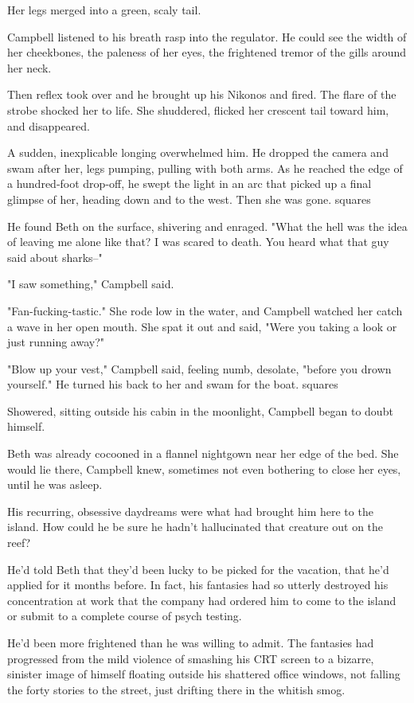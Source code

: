 Her legs merged into a green, scaly tail.

Campbell listened to his breath rasp into the regulator. He could see the width of her cheekbones, the paleness of her eyes, the frightened tremor of the gills around her neck.

Then reflex took over and he brought up his Nikonos and fired. The flare of the strobe shocked her to life. She shuddered, flicked her crescent tail toward him, and disappeared.

A sudden, inexplicable longing overwhelmed him. He dropped the camera and swam after her, legs pumping, pulling with both arms. As he reached the edge of a hundred-foot drop-off, he swept the light in an arc that picked up a final glimpse of her, heading down and to the west. Then she was gone.
squares

He found Beth on the surface, shivering and enraged. "What the hell was the idea of leaving me alone like that? I was scared to death. You heard what that guy said about sharks--"

"I saw something," Campbell said.

"Fan-fucking-tastic." She rode low in the water, and Campbell watched her catch a wave in her open mouth. She spat it out and said, "Were you taking a look or just running away?"

"Blow up your vest," Campbell said, feeling numb, desolate, "before you drown yourself." He turned his back to her and swam for the boat.
squares

Showered, sitting outside his cabin in the moonlight, Campbell began to doubt himself.

Beth was already cocooned in a flannel nightgown near her edge of the bed. She would lie there, Campbell knew, sometimes not even bothering to close her eyes, until he was asleep.

His recurring, obsessive daydreams were what had brought him here to the island. How could he be sure he hadn't hallucinated that creature out on the reef?

He'd told Beth that they'd been lucky to be picked for the vacation, that he'd applied for it months before. In fact, his fantasies had so utterly destroyed his concentration at work that the company had ordered him to come to the island or submit to a complete course of psych testing.

He'd been more frightened than he was willing to admit. The fantasies had progressed from the mild violence of smashing his CRT screen to a bizarre, sinister image of himself floating outside his shattered office windows, not falling the forty stories to the street, just drifting there in the whitish smog.

